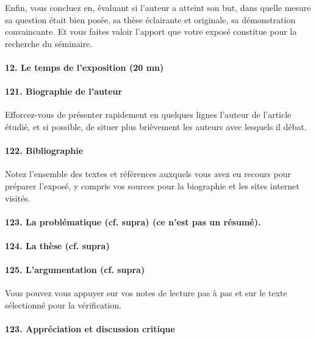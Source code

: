 Enfin, vous concluez en, évaluant si l'auteur a atteint son but, dans
quelle mesure sa question était bien posée, sa thèse éclairante et
originale, sa démonstration convaincante. Et vous faites valoir l'apport
que votre exposé constitue pour la recherche du séminaire.

\paragraph{12. Le temps de l'exposition (20 mn)}

\paragraph{121. Biographie de l'auteur}

Efforcez-vous de présenter rapidement en quelques lignes l'auteur de
l'article étudié, et si possible, de situer plus brièvement les auteurs
avec lesquels il débat.

\paragraph{122. Bibliographie}

Notez l'ensemble des textes et références auxquels vous avez eu recours
pour préparer l'exposé, y compris vos sources pour la biographie et les
sites internet visités.

\paragraph{123. La problématique (cf. supra) (ce n'est pas un résumé).}

\paragraph{124. La thèse (cf. supra)}

\paragraph{125. L'argumentation (cf. supra)}

Vous pouvez vous appuyer sur vos notes de lecture pas à pas et sur le
texte sélectionné pour la vérification.

\paragraph{123. Appréciation et discussion critique}

